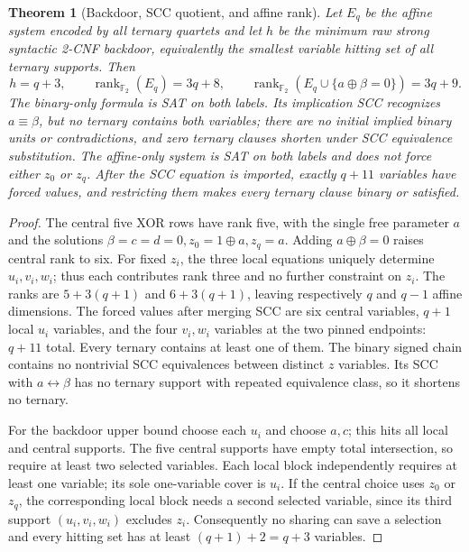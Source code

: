 \documentclass[11pt]{article}
\newtheorem{theorem}{Theorem}
\begin{document}
\begin{theorem}[Backdoor, SCC quotient, and affine rank]
Let $E_q$ be the affine system encoded by all ternary quartets and
let $h$ be the minimum raw strong syntactic 2-CNF backdoor,
equivalently the smallest variable hitting set of all ternary supports.
Then
\[
\boxed{h=q+3,\qquad
\operatorname{rank}_{\mathbb F_2}(E_q)=3q+8,\qquad
\operatorname{rank}_{\mathbb F_2}(E_q\cup\{a\oplus\beta=0\})=3q+9.}
\tag{7}
\]
The binary-only formula is SAT on both labels. Its implication SCC
recognizes $a\equiv\beta$, but no ternary contains both variables;
there are no initial implied binary units or contradictions, and
\emph{zero} ternary clauses shorten under SCC equivalence substitution.
The affine-only system is SAT on both labels and does not force either
$z_0$ or $z_q$. After the SCC equation is imported, exactly $q+11$
variables have forced values, and restricting them makes every
ternary clause binary or satisfied.
\end{theorem}
\begin{proof}
The central five XOR rows have rank five, with the single free
parameter $a$ and the solutions
$\beta=c=d=0,z_0=1\oplus a,z_q=a$.
Adding $a\oplus\beta=0$ raises central rank to six.
For fixed $z_i$, the three local equations uniquely determine
$u_i,v_i,w_i$; thus each contributes rank three and no further
constraint on $z_i$. The ranks are $5+3(q+1)$ and $6+3(q+1)$,
leaving respectively $q$ and $q-1$ affine dimensions.
The forced values after merging SCC are six central variables,
$q+1$ local $u_i$ variables, and the four $v_i,w_i$ variables at
the two pinned endpoints: $q+11$ total. Every ternary contains at
least one of them. The binary signed chain contains no nontrivial
SCC equivalences between distinct $z$ variables. Its SCC with
$a\leftrightarrow\beta$ has no ternary support with repeated
equivalence class, so it shortens no ternary.

For the backdoor upper bound choose each $u_i$ and choose
$a,c$; this hits all local and central supports. The five
central supports have empty total intersection, so require at
least two selected variables. Each local block independently
requires at least one variable; its sole one-variable cover is
$u_i$. If the central choice uses $z_0$ or $z_q$, the corresponding
local block needs a second selected variable, since its third
support $(u_i,v_i,w_i)$ excludes $z_i$. Consequently no sharing
can save a selection and every hitting set has at least
$(q+1)+2=q+3$ variables.
\end{proof}
\end{document}
